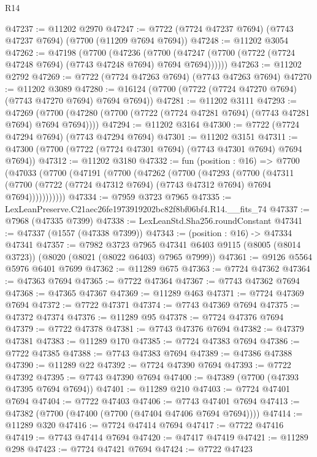 \begin{lexlean}{R14}
\begin{coremodule}
@47237 := @11202 @2970
@47247 := @7722 (@7724 @47237 @7694) (@7743 @47237 @7694) (@7700 (@11209 @7694 @7694))
@47248 := @11202 @3054
@47262 := @47198
    (@7700
      (@47236
        (@7700 (@47247 (@7700 (@7722 (@7724 @47248 @7694) (@7743 @47248 @7694) @7694 @7694))))))
@47263 := @11202 @2792
@47269 := @7722 (@7724 @47263 @7694) (@7743 @47263 @7694)
@47270 := @11202 @3089
@47280 := @16124 (@7700 (@7722 (@7724 @47270 @7694) (@7743 @47270 @7694) @7694 @7694))
@47281 := @11202 @3111
@47293 := @47269
    (@7700 (@47280 (@7700 (@7722 (@7724 @47281 @7694) (@7743 @47281 @7694) @7694 @7694))))
@47294 := @11202 @3164
@47300 := @7722 (@7724 @47294 @7694) (@7743 @47294 @7694)
@47301 := @11202 @3151
@47311 := @47300 (@7700 (@7722 (@7724 @47301 @7694) (@7743 @47301 @7694) @7694 @7694))
@47312 := @11202 @3180
@47332 := fun (position : @16) =>
  @7700
    (@47033
      (@7700
        (@47191
          (@7700
            (@47262
              (@7700
                (@47293
                  (@7700
                    (@47311
                      (@7700 (@7722 (@7724 @47312 @7694) (@7743 @47312 @7694) @7694 @7694)))))))))))
@47334 := @7959 @3723 @7965
@47335 := LexLeanPreserve.C21aec26fe1973919202bc82f8bf06bf4.R14.__fits_74
@47337 := @7968 (@47335 @7399)
@47338 := LexLeanStd.Sha256.roundConstant
@47341 := @47337 (@1557 (@47338 @7399))
@47343 := (position : @16) -> @47334 @47341
@47357 := @7982
    @3723
    @7965
    @47341
    @6403
    @9115
    (@8005 (@8014 @3723))
    (@8020 (@8021 (@8022 @6403) @7965 @7999))
@47361 := @9126 @5564 @5976 @6401 @7699
@47362 := @11289 @675
@47363 := @7724 @47362
@47364 := @47363 @7694
@47365 := @7722 @47364
@47367 := @7743 @47362 @7694
@47368 := @47365 @47367
@47369 := @11289 @463
@47371 := @7724 @47369 @7694
@47372 := @7722 @47371
@47374 := @7743 @47369 @7694
@47375 := @47372 @47374
@47376 := @11289 @95
@47378 := @7724 @47376 @7694
@47379 := @7722 @47378
@47381 := @7743 @47376 @7694
@47382 := @47379 @47381
@47383 := @11289 @170
@47385 := @7724 @47383 @7694
@47386 := @7722 @47385
@47388 := @7743 @47383 @7694
@47389 := @47386 @47388
@47390 := @11289 @22
@47392 := @7724 @47390 @7694
@47393 := @7722 @47392
@47395 := @7743 @47390 @7694
@47400 := @47389 (@7700 (@47393 @47395 @7694 @7694))
@47401 := @11289 @210
@47403 := @7724 @47401 @7694
@47404 := @7722 @47403
@47406 := @7743 @47401 @7694
@47413 := @47382 (@7700 (@47400 (@7700 (@47404 @47406 @7694 @7694))))
@47414 := @11289 @320
@47416 := @7724 @47414 @7694
@47417 := @7722 @47416
@47419 := @7743 @47414 @7694
@47420 := @47417 @47419
@47421 := @11289 @298
@47423 := @7724 @47421 @7694
@47424 := @7722 @47423

\end{coremodule}
\end{lexlean}
